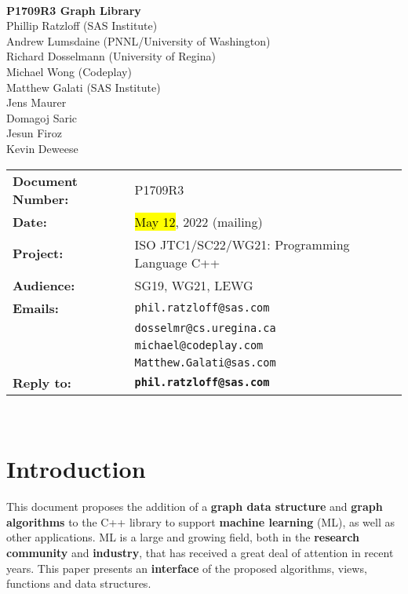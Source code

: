 \documentclass[10pt,onecolumn]{article}
\begin{document}
\begin{titlepage}
~
\vfill
\begin{center}
\LARGE
\textbf{P1709R3 Graph Library}\\
\vspace{12pt}
\normalsize
	Phillip Ratzloff (SAS Institute)\\
	Andrew Lumsdaine (PNNL/University of Washington)\\
	Richard Dosselmann (University of Regina)\\
	Michael Wong (Codeplay)\\
	Matthew Galati (SAS Institute)\\	
	Jens Maurer\\
	Domagoj Saric\\
	Jesun Firoz\\
	Kevin Deweese\\
\end{center}
\vspace{32pt}
\begin{tabular}{ll}
\textbf{Document Number:} & P1709R3\\
\textbf{Date:} & \hl{May 12}, 2022 (mailing)\\ 
\textbf{Project:} & ISO JTC1/SC22/WG21: Programming Language C++\\
\textbf{Audience:} & SG19, WG21, LEWG\\
\textbf{Emails:}
	&\texttt{phil.ratzloff@sas.com}\\
	&\texttt{dosselmr@cs.uregina.ca}\\
	&\texttt{michael@codeplay.com}\\
	&\texttt{Matthew.Galati@sas.com}\\
\textbf{Reply to:}
	&\texttt{\textbf{phil.ratzloff@sas.com}}\\
\end{tabular}
\vfill
~
\end{titlepage}

\tableofcontents

\clearpage

\section{Introduction}
This document proposes the addition of a \textbf{graph data structure} and \textbf{graph algorithms} to the C++ library to support \textbf{machine learning} (ML), as well as other applications. ML is a large and growing field, both in the \textbf{research community} and \textbf{industry}, that has received a great deal of attention in recent years. This paper presents an \textbf{interface} of the proposed algorithms, views, functions and data structures.
\end{document}
